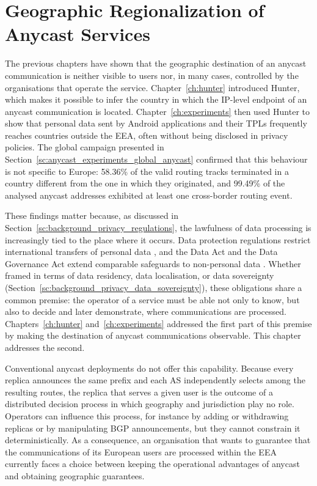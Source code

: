\chapter{Geographic Regionalization of Anycast Services}
\label{ch:rcadns}

The previous chapters have shown that the geographic destination of an anycast communication is neither visible to users nor, in many cases, controlled by the organisations that operate the service. Chapter~\ref{ch:hunter} introduced Hunter, which makes it possible to infer the country in which the IP-level endpoint of an anycast communication is located. Chapter~\ref{ch:experiments} then used Hunter to show that personal data sent by Android applications and their TPLs frequently reaches countries outside the EEA, often without being disclosed in privacy policies. The global campaign presented in Section~\ref{sc:anycast_experiments_global_anycast} confirmed that this behaviour is not specific to Europe: 58.36\% of the valid routing tracks terminated in a country different from the one in which they originated, and 99.49\% of the analysed anycast addresses exhibited at least one cross-border routing event.

These findings matter because, as discussed in Section~\ref{sc:background_privacy_regulations}, the lawfulness of data processing is increasingly tied to the place where it occurs. Data protection regulations restrict international transfers of personal data \cite{REGULATIONSRelevance, CourtII}, and the Data Act and the Data Governance Act extend comparable safeguards to non-personal data \cite{2022DataAct, 2022DataActb}. Whether framed in terms of data residency, data localisation, or data sovereignty (Section~\ref{sc:background_privacy_data_sovereignty}), these obligations share a common premise: the operator of a service must be able not only to know, but also to decide and later demonstrate, where communications are processed. Chapters~\ref{ch:hunter} and~\ref{ch:experiments} addressed the first part of this premise by making the destination of anycast communications observable. This chapter addresses the second.

Conventional anycast deployments do not offer this capability. Because every replica announces the same prefix and each AS independently selects among the resulting routes, the replica that serves a given user is the outcome of a distributed decision process in which geography and jurisdiction play no role. Operators can influence this process, for instance by adding or withdrawing replicas or by manipulating BGP announcements, but they cannot constrain it deterministically. As a consequence, an organisation that wants to guarantee that the communications of its European users are processed within the EEA currently faces a choice between keeping the operational advantages of anycast and obtaining geographic guarantees.


